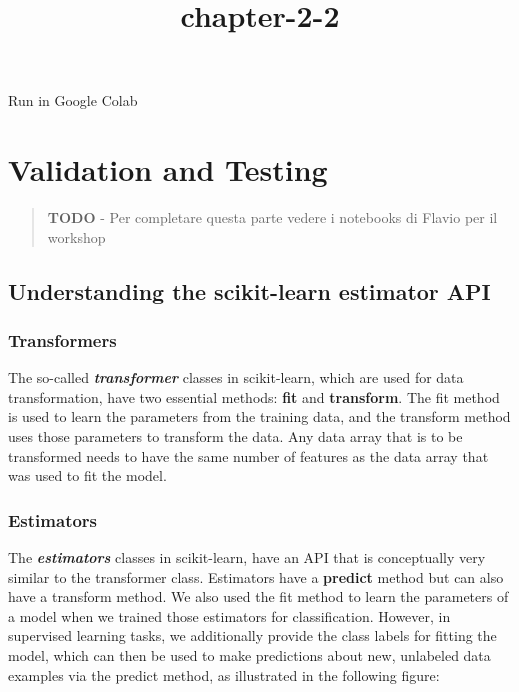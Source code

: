 \documentclass[11pt]{article}
\title{chapter-2-2}
\begin{document}
    
    \maketitle
    
    

    
    Run in Google Colab

    \hypertarget{validation-and-testing}{%
\section{Validation and Testing}\label{validation-and-testing}}

    \begin{quote}
\textbf{TODO} - Per completare questa parte vedere i notebooks di Flavio
per il workshop
\end{quote}

    \hypertarget{understanding-the-scikit-learn-estimator-api}{%
\subsection{Understanding the scikit-learn estimator
API}\label{understanding-the-scikit-learn-estimator-api}}

    

    \hypertarget{transformers}{%
\subsubsection{Transformers}\label{transformers}}

The so-called \textbf{\emph{transformer}} classes in scikit-learn, which
are used for data transformation, have two essential methods:
\textbf{fit} and \textbf{transform}. The fit method is used to learn the
parameters from the training data, and the transform method uses those
parameters to transform the data. Any data array that is to be
transformed needs to have the same number of features as the data array
that was used to fit the model.

    \hypertarget{estimators}{%
\subsubsection{Estimators}\label{estimators}}

The \textbf{\emph{estimators}} classes in scikit-learn, have an API that
is conceptually very similar to the transformer class. Estimators have a
\textbf{predict} method but can also have a transform method. We also
used the fit method to learn the parameters of a model when we trained
those estimators for classification. However, in supervised learning
tasks, we additionally provide the class labels for fitting the model,
which can then be used to make predictions about new, unlabeled data
examples via the predict method, as illustrated in the following figure:
\end{document}
